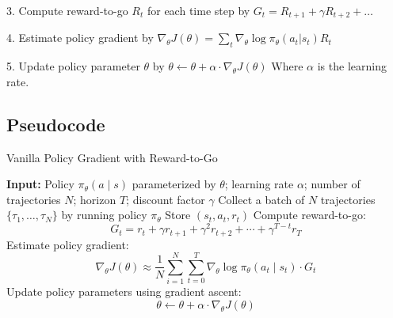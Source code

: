 \documentclass{article} %
\begin{document}
3. Compute reward-to-go \(R_t\) for each time step by $G_t = R_{t+1} + \gamma R_{t+2} + \ldots$

4. Estimate policy gradient by $\nabla_\theta J(\theta) = \sum_{t} \nabla_\theta \log \pi_\theta (a_t | s_t) R_t $
 
5. Update policy parameter \(\theta\) by $
\theta \leftarrow \theta + \alpha \cdot \nabla_\theta J(\theta)$
Where \(\alpha\) is the learning rate.


\subsection{Pseudocode}
\begin{algorithm}[H]
\caption{Vanilla Policy Gradient with Reward-to-Go}
\begin{algorithmic}[1]
\State \textbf{Input:} Policy $\pi_{\theta}(a \mid s)$ parameterized by $\theta$; learning rate $\alpha$; number of trajectories $N$; horizon $T$; discount factor $\gamma$
    \State Collect a batch of $N$ trajectories $\{\tau_1, \ldots, \tau_N\}$ by running policy $\pi_{\theta}$
            \State Store $(s_t, a_t, r_t)$
            \State Compute reward-to-go:
            \[
            G_t = r_t + \gamma r_{t+1} + \gamma^2 r_{t+2} + \cdots + \gamma^{T-t} r_T
            \]
        \EndFor
    \EndFor
    \State Estimate policy gradient:
    \[
    \nabla_{\theta}J(\theta) \approx \frac{1}{N} \sum_{i=1}^{N} \sum_{t=0}^{T} \nabla_{\theta} \log \pi_{\theta}(a_t \mid s_t) \cdot G_t
    \]
    \State Update policy parameters using gradient ascent:
    \[
    \theta \leftarrow \theta + \alpha \cdot \nabla_{\theta} J(\theta)
    \]
\EndWhile
\end{algorithmic}
\end{algorithm}



\end{document}
